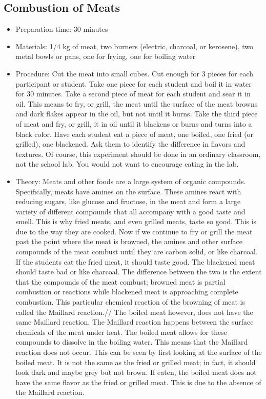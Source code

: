 \subsection{Combustion of Meats}
\begin{itemize}
\item{Preparation time: 30 minutes}
\item{Materials: 1/4 kg of meat, two burners (electric, charcoal, or kerosene), two metal bowls or pans, one for frying, one for boiling water}
\item{Procedure: Cut the meat into small cubes. Cut enough for 3 pieces for each participant or student. Take one piece for each student and boil it in water for 30 minutes. Take a second piece of meat for each student and sear it in oil. This means to fry, or grill, the meat until the surface of the meat browns and dark flakes appear in the oil, but not until it burns. Take the third piece of meat and fry, or grill, it in oil until it blackens or burns and turns into a black color. Have each student eat a piece of meat, one boiled, one fried (or grilled), one blackened. Ask them to identify the difference in flavors and textures. Of course, this experiment should be done in an ordinary classroom, not the school lab. You would not want to encourage eating in the lab.}
\item{Theory: Meats and other foods are a large system of organic compounds. Specifically, meats have amines on the surface. These amines react with reducing sugars, like glucose and fructose, in the meat and form a large variety of different compounds that all accompany with a good taste and smell. This is why fried meats, and even grilled meats, taste so good. This is due to the way they are cooked. Now if we continue to fry or grill the meat past the point where the meat is browned, the amines and other surface compounds of the meat combust until they are carbon solid, or like charcoal. If the students eat the fried meat, it should taste good. The blackened meat should taste bad or like charcoal. The difference between the two is the extent that the compounds of the meat combust; browned meat is partial combustion or reactions while blackened meat is approaching complete combustion. This particular chemical reaction of the browning of meat is called the Maillard reaction.//
The boiled meat however, does not have the same Maillard reaction. The Maillard reaction happens between the surface chemicals of the meat under heat. The boiled meat allows for these compounds to dissolve in the boiling water. This means that the Maillard reaction does not occur. This can be seen by first looking at the surface of the boiled meat. It is not the same as the fried or grilled meat; in fact, it should look dark and maybe grey but not brown. If eaten, the boiled meat does not have the same flavor as the fried or grilled meat. This is due to the absence of the Maillard reaction.}
\end{itemize}

